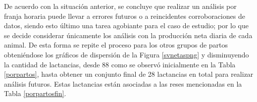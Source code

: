 De acuerdo con la situación anterior, se concluye que realizar un análisis por franja horaria puede llevar a errores futuros o a reincidentes corroboraciones de datos, siendo esto último una tarea agobiante para el caso de estudio; por lo que se decide considerar únicamente los análisis con la producción neta diaria de cada animal. De esta forma se repite el proceso para los otros grupos de partos obteniéndose los gráficos de dispersión de la Figura \ref{svnetaspng} y disminuyendo la cantidad de lactancias, desde 88 como se observó inicialmente en la Tabla \ref{porpartos}, hasta obtener un conjunto final de 28 lactancias en total para realizar análisis futuros. Estas lactancias están asociadas a las reses mencionadas en la Tabla \ref{porpartosfin}.

